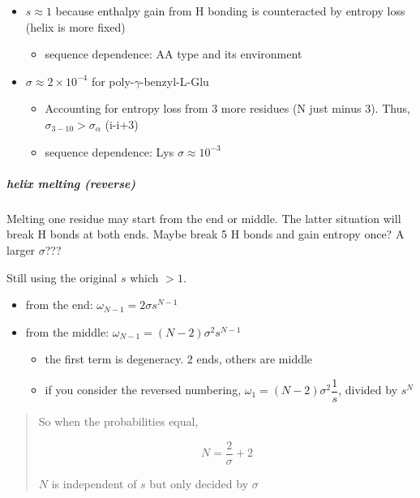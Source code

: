 \documentclass[]{article}
\let\oldsubparagraph\subparagraph
\renewcommand{\subparagraph}[1]{\oldsubparagraph{#1}\mbox{}}
\begin{document}
\begin{itemize}
\item
  \(s\approx1\) because enthalpy gain from H bonding is counteracted by
  entropy loss (helix is more fixed)

  \begin{itemize}
  \item
    sequence dependence: AA type and its environment
  \end{itemize}
\item
  \(\sigma\approx2\times10^{-4}\) for poly-\(\gamma\)-benzyl-L-Glu

  \begin{itemize}
  \item
    Accounting for entropy loss from 3 more residues (N just minus 3).
    Thus, \(\sigma_{3-10}>\sigma_{\alpha}\) (i-i+3)
  \item
    sequence dependence: Lys \(\sigma\approx10^{-3}\)
  \end{itemize}
\end{itemize}

\hypertarget{helix-melting-reverse}{%
\subparagraph{helix melting (reverse)}\label{helix-melting-reverse}}

Melting one residue may start from the end or middle. The latter
situation will break H bonds at both ends. Maybe break 5 H bonds and
gain entropy once? A larger \(\sigma\)???

Still using the original \(s\) which \(>1\).

\begin{itemize}
\item
  from the end: \(\omega_{N-1}=2\sigma s^{N-1}\) 
\item
  from the middle: \(\omega_{N-1}=(N-2)\sigma^2 s^{N-1}\)

  \begin{itemize}
  \item
    the first term is degeneracy. 2 ends, others are middle
  \item
    if you consider the reversed numbering,
    \(\omega_1=(N-2)\sigma^2\dfrac{1}{s}\), divided by \(s^{N}\) 
  \end{itemize}
\end{itemize}

\begin{quote}
So when the probabilities equal,

\[N=\dfrac{2}{\sigma}+2\]

\(N\) is independent of \(s\) but only decided by \(\sigma\)
\end{quote}
\end{document}
